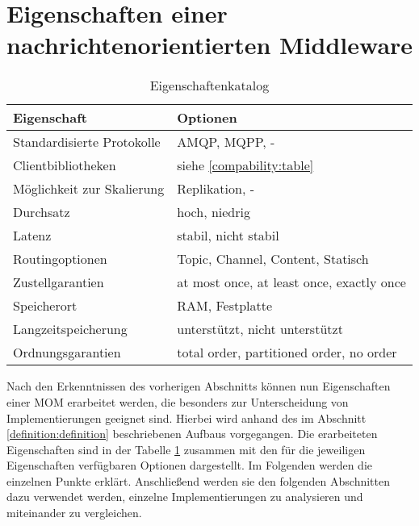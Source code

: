 \section{Eigenschaften einer nachrichtenorientierten Middleware}
\label{formal}

\begin{table}[h]
  \centering
  \begin{tabular}{|l|l|}
    \hline
    \textbf{Eigenschaft} & \textbf{Optionen} \\ \hline
    Standardisierte Protokolle & AMQP, MQPP, - \\ \hline
    Clientbibliotheken & siehe \ref{compability:table}\\ \hline
    Möglichkeit zur Skalierung & Replikation, - \\ \hline
    Durchsatz & hoch, niedrig \\ \hline
    Latenz & stabil, nicht stabil \\ \hline
    Routingoptionen & Topic, Channel, Content, Statisch \\ \hline
    Zustellgarantien & at most once, at least once, exactly once \\ \hline
    Speicherort & RAM, Festplatte \\ \hline
    Langzeitspeicherung & unterstützt, nicht unterstützt \\ \hline
    Ordnungsgarantien & total order, partitioned order, no order \\ \hline

  \end{tabular}
  \caption{Eigenschaftenkatalog}
  \label{catalogue}
\end{table}

Nach den Erkenntnissen des vorherigen Abschnitts können nun Eigenschaften
einer MOM erarbeitet werden, die besonders zur Unterscheidung von
Implementierungen geeignet sind. Hierbei wird anhand des im Abschnitt
\ref{definition:definition} beschriebenen Aufbaus vorgegangen.
Die erarbeiteten Eigenschaften sind in der Tabelle \ref{catalogue} zusammen mit
den für die jeweiligen Eigenschaften verfügbaren Optionen dargestellt. Im
Folgenden werden die einzelnen Punkte erklärt.
Anschließend werden sie den folgenden Abschnitten dazu verwendet werden,
einzelne Implementierungen zu analysieren und miteinander zu vergleichen.

